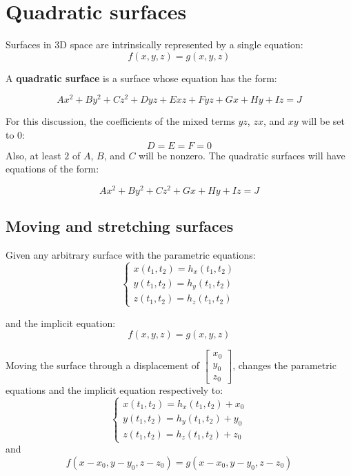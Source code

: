 \documentclass{article}
\begin{document}
\section*{Quadratic surfaces}

Surfaces in 3D space are intrinsically represented by a single equation:
\[f(x, y, z) = g(x, y, z)\]

A {\bf quadratic surface} is a surface whose equation has the form:

\[Ax^2 + By^2 + Cz^2 + Dyz + Exz + Fyz + Gx + Hy + Iz = J\]

For this discussion, the coefficients of the mixed terms \(yz\), \(zx\), and \(xy\) will be set to \(0\):
\[D = E = F = 0\]
Also, at least \(2\) of \(A\), \(B\), and \(C\) will be nonzero. The quadratic surfaces will have equations of the form:

\[Ax^2 + By^2 + Cz^2 + Gx + Hy + Iz = J\]




\subsection*{Moving and stretching surfaces}

Given any arbitrary surface with the parametric equations:
\[\left\{\begin{array}{c} x(t_1, t_2) = h_x(t_1, t_2) \\ y(t_1, t_2) = h_y(t_1, t_2) \\ z(t_1, t_2) = h_z(t_1, t_2) \end{array}\right.\]

and the implicit equation:
\[f(x, y, z) = g(x, y, z)\]

\vspace{5mm}

Moving the surface through a displacement of \(\begin{bmatrix} x_0 \\ y_0 \\ z_0 \end{bmatrix}\), changes the parametric equations and the implicit equation respectively to:
\[\left\{\begin{array}{c} x(t_1, t_2) = h_x(t_1, t_2) + x_0 \\ y(t_1, t_2) = h_y(t_1, t_2) + y_0 \\ z(t_1, t_2) = h_z(t_1, t_2) + z_0 \end{array}\right.\]
and 
\[f(x - x_0, y - y_0, z - z_0) = g(x - x_0, y - y_0, z - z_0)\]
\end{document}
